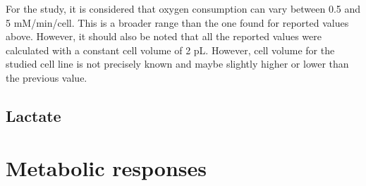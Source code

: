 \documentclass[11pt,a4paper]{article}
\begin{document}
For the study, it is considered that oxygen consumption can vary between 0.5 and 5 mM/min/cell. This is a broader range than the one found for reported values above. However, it should also be noted that all the reported values were calculated with a constant cell volume of 2 pL. However, cell volume for the studied cell line is not precisely known and maybe slightly higher or lower than the previous value.\\

\subsection{}

\subsection{Lactate}

\section{Metabolic responses} 

\newpage


\end{document}
